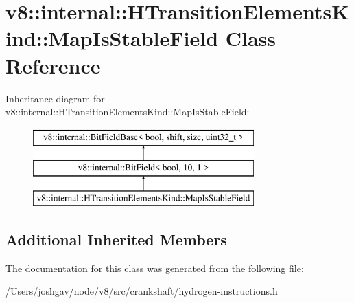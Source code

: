 \hypertarget{classv8_1_1internal_1_1_h_transition_elements_kind_1_1_map_is_stable_field}{}\section{v8\+:\+:internal\+:\+:H\+Transition\+Elements\+Kind\+:\+:Map\+Is\+Stable\+Field Class Reference}
\label{classv8_1_1internal_1_1_h_transition_elements_kind_1_1_map_is_stable_field}
Inheritance diagram for v8\+:\+:internal\+:\+:H\+Transition\+Elements\+Kind\+:\+:Map\+Is\+Stable\+Field\+:\begin{figure}[H]
\begin{center}
\leavevmode
\includegraphics[height=3.000000cm]{classv8_1_1internal_1_1_h_transition_elements_kind_1_1_map_is_stable_field}
\end{center}
\end{figure}
\subsection*{Additional Inherited Members}


The documentation for this class was generated from the following file\+:\begin{DoxyCompactItemize}
\item 
/\+Users/joshgav/node/v8/src/crankshaft/hydrogen-\/instructions.\+h\end{DoxyCompactItemize}
